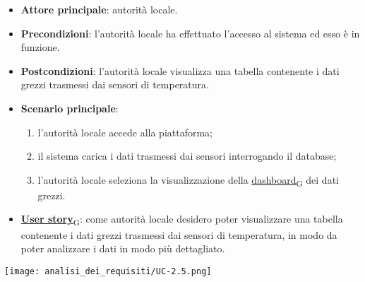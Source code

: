 \begin{itemize}
	\item \textbf{Attore principale}: autorità locale.
	\item \textbf{Precondizioni}: l'autorità locale ha effettuato l'accesso al sistema ed esso è in funzione.
	\item \textbf{Postcondizioni}: l'autorità locale visualizza una tabella contenente i dati grezzi trasmessi dai sensori di temperatura.
	\item \textbf{Scenario principale}:
	      \begin{enumerate}
		      \item l'autorità locale accede alla piattaforma;
		      \item il sistema carica i dati trasmessi dai sensori interrogando il database;
		      \item l'autorità locale seleziona la visualizzazione della \href{https://7last.github.io/docs/rtb/documentazione-interna/glossario\#dashboard}{dashboard\textsubscript{G}} dei dati grezzi.
	      \end{enumerate}
	\item \href{https://7last.github.io/docs/rtb/documentazione-interna/glossario\#user-story}{\textbf{User story}\textsubscript{G}}:
	    come autorità locale desidero poter visualizzare una tabella contenente i dati grezzi trasmessi dai sensori di temperatura,
	    in modo da poter analizzare i dati in modo più dettagliato.
\end{itemize}
\begin{center}
	\texttt{[image: analisi\_dei\_requisiti/UC-2.5.png]}
\end{center}
\newpage
{}
